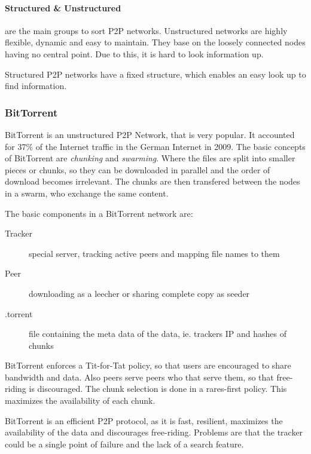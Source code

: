 \paragraph{Structured & Unstructured} %
\label{par:structured_unstructured}
are the main groups to sort P2P networks.
Unstructured networks are highly flexible,
dynamic and easy to maintain.
They base on the loosely connected nodes having no central point.
Due to this, it is hard to look information up.

Structured P2P networks have a fixed structure,
which enables an easy look up to find information.

\subsubsection{BitTorrent} %
\label{ssub:bittorrent}
BitTorrent is an unstructured P2P Network, that is very popular.
It accounted for 37\% of the Internet traffic in the German Internet in 2009.
The basic concepts of BitTorrent are \emph{chunking} and \emph{swarming}.
Where the files are split into smaller pieces or chunks,
so they can be downloaded in parallel and the order of download becomes irrelevant.
The chunks are then transfered between the nodes in a swarm,
who exchange the same content.

The basic components in a BitTorrent network are:
\begin{description}
	\item[Tracker] special server, tracking active peers and mapping file names to them
	\item[Peer] downloading as a leecher or sharing complete copy as seeder
	\item[.torrent] file containing the meta data of the data, ie. trackers IP and hashes of chunks
\end{description}

BitTorrent enforces a Tit-for-Tat policy,
so that users are encouraged to share bandwidth and data.
Also peers serve peers who that serve them,
so that free-riding is discouraged.
The chunk selection is done in a rares-first policy.
This maximizes the availability of each chunk.

BitTorrent is an efficient P2P protocol,
as it is fast, resilient, maximizes the availability of the data
and discourages free-riding.
Problems are that the tracker could be a single point of failure
and the lack of a search feature.

